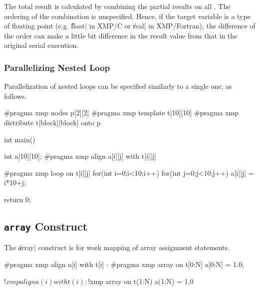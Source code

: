 \begin{mynote}
  The total result is calculated by combining the partial results on all
  {\nodes}. The ordering of the combination is unspecified.
%
  Hence, if the target variable is a type of floating
  point (e.g. \|float| in XMP/C or \|real| in XMP/Fortran), the
  difference of the order can make a little bit
  difference in the result value from that in the original serial
  execution.
\end{mynote}


\subsubsection{Parallelizing Nested Loop}

Parallelization of nested loops can be specified similarly to a single
one, as follows.

\begin{XCexample}
#pragma xmp nodes p[2][2]
#pragma xmp template t[10][10]
#pragma xmp distribute t[block][block] onto p

int main(){
  int a[10][10];
#pragma xmp align a[i][j] with t[i][j]

#pragma xmp loop on t[i][j]
  for(int i=0;i<10;i++)
    for(int j=0;j<10;j++)
      a[i][j] = i*10+j;

  return 0;
}
\end{XCexample}



\subsection{{\tt array} Construct}

The \|array| construct is for work mapping of array assignment statements.

\begin{XCexample}
#pragma xmp align a[i] with t[i]
  :
#pragma xmp array on t[0:N]
a[0:N] = 1.0;
\end{XCexample}

\begin{XFexample}
!$xmp align a(i) with t(i)
  :
!$xmp array on t(1:N)
a(1:N) = 1.0
\end{XFexample}

